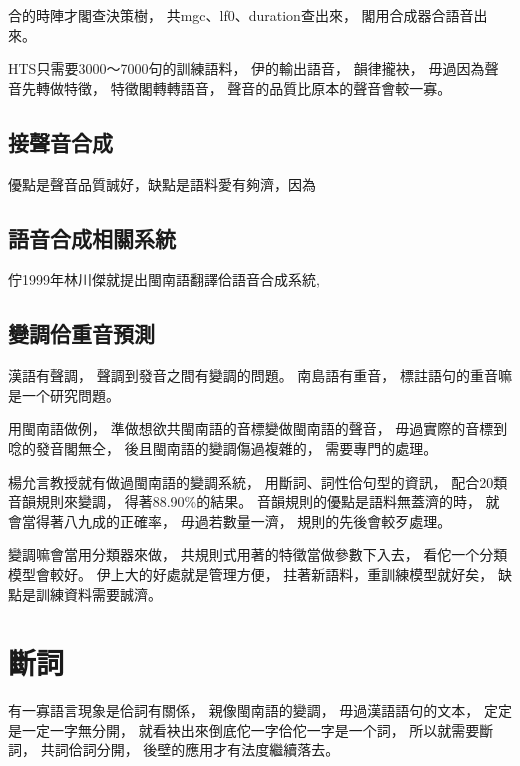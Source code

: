 合的時陣才閣查決策樹，
共mgc、lf0、duration查出來，
閣用合成器合語音出來。

HTS只需要3000～7000句的訓練語料，
伊的輸出語音，
韻律攏袂，
毋過因為聲音先轉做特徵，
特徵閣轉轉語音，
聲音的品質比原本的聲音會較一寡。


\subsection{接聲音合成}
\label{小節：接聲音合成}

優點是聲音品質誠好，缺點是語料愛有夠濟，因為

\subsection{語音合成相關系統}
\label{小節：語音合成相關系統}
佇1999年林川傑就提出閩南語翻譯佮語音合成系統\cite{中文到閩南語之線上翻譯及閩南語之語音合成},

\subsection{變調佮重音預測}
\label{小節：變調佮重音預測}
漢語有聲調，
聲調到發音之間有變調的問題。
南島語有重音，
標註語句的重音嘛是一个研究問題。

用閩南語做例，
準做想欲共閩南語的音標變做閩南語的聲音，
毋過實際的音標到唸的發音閣無仝，
後且閩南語的變調傷過複雜的，
需要專門的處理。

楊允言教授就有做過閩南語的變調系統\cite{iunn:台語變調系統實作研究}，
用斷詞、詞性佮句型的資訊，
配合20類音韻規則來變調，
得著88.90\%的結果。
音韻規則的優點是語料無蓋濟的時，
就會當得著八九成的正確率，
毋過若數量一濟，
規則的先後會較歹處理。

變調嘛會當用分類器來做，
共規則式用著的特徵當做參數下入去，
看佗一个分類模型會較好。
伊上大的好處就是管理方便，
拄著新語料，重訓練模型就好矣，
缺點是訓練資料需要誠濟。


\section{斷詞}
\label{節：斷詞}
有一寡語言現象是佮詞有關係，
親像閩南語的變調，
毋過漢語語句的文本，
定定是一定一字無分開，
就看袂出來倒底佗一字佮佗一字是一个詞，
所以就需要斷詞，
共詞佮詞分開，
後壁的應用才有法度繼續落去。



